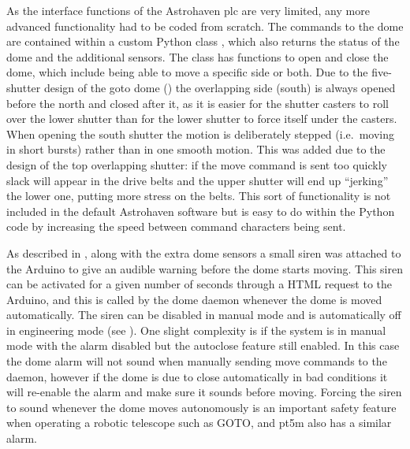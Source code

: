 \begin{colsection}
\begin{colsection}
As the interface functions of the Astrohaven \gls{plc} are very limited, any more advanced functionality had to be coded from scratch. The commands to the dome are contained within a custom Python class , which also returns the status of the dome and the additional sensors. The class has functions to open and close the dome, which include being able to move a specific side or both. Due to the five-shutter design of the \gls{goto} dome () the overlapping side (south) is always opened before the north and closed after it, as it is easier for the shutter casters to roll over the lower shutter than for the lower shutter to force itself under the casters. When opening the south shutter the motion is deliberately stepped (i.e.\ moving in short bursts) rather than in one smooth motion. This was added due to the design of the top overlapping shutter: if the move command is sent too quickly slack will appear in the drive belts and the upper shutter will end up ``jerking'' the lower one, putting more stress on the belts. This sort of functionality is not included in the default Astrohaven software but is easy to do within the Python code by increasing the speed between command characters being sent.

As described in , along with the extra dome sensors a small siren was attached to the Arduino to give an audible warning before the dome starts moving. This siren can be activated for a given number of seconds through a HTML request to the Arduino, and this is called by the dome daemon whenever the dome is moved automatically. The siren can be disabled in manual mode and is automatically off in engineering mode (see ). One slight complexity is if the system is in manual mode with the alarm disabled but the autoclose feature still enabled. In this case the dome alarm will not sound when manually sending move commands to the daemon, however if the dome is due to close automatically in bad conditions it will re-enable the alarm and make sure it sounds before moving. Forcing the siren to sound whenever the dome moves autonomously is an important safety feature when operating a robotic telescope such as GOTO, and pt5m also has a similar alarm.


\end{colsection}
\end{colsection}
